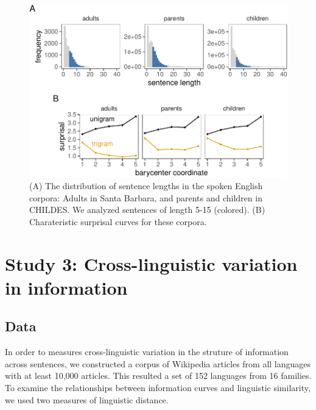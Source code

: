 \documentclass[10pt, letterpaper]{article}
\newenvironment{CodeChunk}{}{}
\begin{document}
\begin{CodeChunk}
\begin{figure}[tb]

{\centering \includegraphics{figs/spoken_figs-1} 

}

\caption[(A) The distribution of sentence lengths in the spoken English corpora]{(A) The distribution of sentence lengths in the spoken English corpora: Adults in Santa Barbara, and parents and children in CHILDES. We analyzed sentences of length 5-15 (colored). (B) Charateristic surprisal curves for these corpora.}\label{fig:spoken_figs}
\end{figure}
\end{CodeChunk}

\hypertarget{study-3-cross-linguistic-variation-in-information}{%
\section{Study 3: Cross-linguistic variation in
information}\label{study-3-cross-linguistic-variation-in-information}}

\hypertarget{data-2}{%
\subsection{Data}\label{data-2}}

In order to measures cross-linguistic variation in the struture of
information across sentences, we constructed a corpus of Wikipedia
articles from all languages with at least 10,000 articles. This resulted
a set of 152 languages from 16 families. To examine the relationships
between information curves and linguistic similarity, we used two
measures of linguistic distance.
\end{document}
